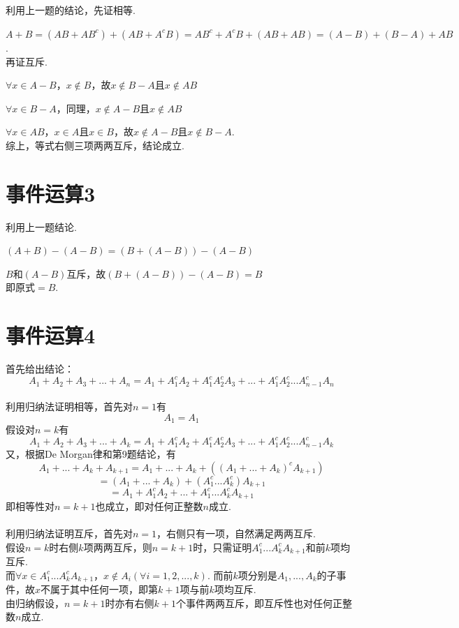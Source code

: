 \documentclass{article}
\begin{document}
\begin{CJK}{UTF8}{gbsn}
\subsection{}
利用上一题的结论，先证相等.\par
$ A+B=(AB+AB^{c})+(AB+A^{c}B)=AB^{c}+A^{c}B+(AB+AB)=(A-B)+(B-A)+AB$.\\
再证互斥.\par
$\forall x\in A-B$，$x\notin B$，故$x\notin B-A$且$x\notin AB$\par
$\forall x\in B-A$，同理，$x\notin A-B$且$x\notin AB$\par
$\forall x\in AB$，$x\in A$且$x\in B$，故$x\notin A-B$且$x\notin B-A$.\\
综上，等式右侧三项两两互斥，结论成立.
\section{事件运算3}
利用上一题结论.\par
$(A+B)-(A-B)=(B+(A-B))-(A-B)$\par
$B$和$(A-B)$互斥，故$(B+(A-B))-(A-B)=B$\\
即原式$=B$.
\section{事件运算4}
首先给出结论：
$$ A_{1}+A_{2}+A_{3}+...+A_{n}=A_{1}+A_{1}^{c}A_{2}+A_{1}^{c}A_{2}^{c}A_{3}+...+A_{1}^{c}A_{2}^{c}...A_{n-1}^{c}A_{n} $$\\
利用归纳法证明相等，首先对$n=1$有
$$ A_{1}=A_{1} $$
假设对$n=k$有
$$ A_{1}+A_{2}+A_{3}+...+A_{k}=A_{1}+A_{1}^{c}A_{2}+A_{1}^{c}A_{2}^{c}A_{3}+...+A_{1}^{c}A_{2}^{c}...A_{n-1}^{c}A_{k} $$
又，根据De Morgan律和第9题结论，有
$$ A_{1}+...+A_{k}+A_{k+1}=A_{1}+...+A_{k}+((A_{1}+...+A_{k})^{c}A_{k+1})$$ 
$$ =(A_{1}+...+A_{k})+(A_{1}^{c}...A_{k}^{c})A_{k+1}$$
$$ =A_{1}+A_{1}^{c}A_{2}+...+A_{1}^{c}...A_{k}^{c}A_{k+1}$$
即相等性对$n=k+1$也成立，即对任何正整数$n$成立.\\\\
利用归纳法证明互斥，首先对$n=1$，右侧只有一项，自然满足两两互斥.\\
假设$n=k$时右侧$k$项两两互斥，则$n=k+1$时，只需证明$A_{1}^{c}...A_{k}^{c}A_{k+1}$和前$k$项均互斥.\\
而$\forall x\in A_{1}^{c}...A_{k}^{c}A_{k+1}$，$x\notin A_{i}(\forall i=1,2,...,k)$. 而前$k$项分别是$A_{1},...,A_{k}$的子事件，故$x$不属于其中任何一项，即第$k+1$项与前$k$项均互斥.\\
由归纳假设，$n=k+1$时亦有右侧$k+1$个事件两两互斥，即互斥性也对任何正整数$n$成立.

\end{CJK}
\end{document}

